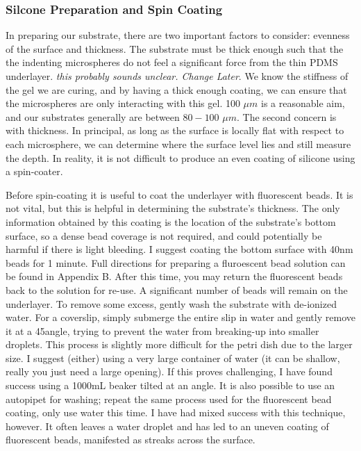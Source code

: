 \subsubsection{Silcone Preparation and Spin Coating} 
In preparing our substrate, there are two important factors to consider: evenness of the surface and thickness. The substrate must be thick enough such that the the indenting microspheres do not feel a significant force from the thin PDMS underlayer. \emph{this probably sounds unclear. Change Later}. We know the stiffness of the gel we are curing, and by having a thick enough coating, we can ensure that the microspheres are only interacting with this gel. 100 $\mu m$ is a reasonable aim, and our substrates generally are between $80-100$ $\mu m$. The second concern is with thickness. In principal, as long as the surface is locally flat with respect to each microsphere, we can determine where the surface level lies and still measure the depth. In reality, it is not difficult to produce an even coating of silicone using a spin-coater. 

Before spin-coating it is useful to coat the underlayer with fluorescent beads. It is not vital, but this is helpful in determining the substrate's thickness. The only information obtained by this coating is the location of the substrate's bottom surface, so a dense bead coverage is not required, and could potentially be harmful if there is light bleeding. I suggest coating the bottom surface with 40nm beads for 1 minute. Full directions for preparing a fluroescent bead solution can be found in Appendix B. After this time, you may return the fluorescent beads back to the solution for re-use. A significant number of beads will remain on the underlayer. To remove some excess, gently wash the substrate with de-ionized water. For a coverslip, simply submerge the entire slip in water and gently remove it at a 45\degree angle, trying to prevent the water from breaking-up into smaller droplets. This process is slightly more difficult for the petri dish due to the larger size. I suggest  (either) using a very large container of water (it can be shallow, really you just need a large opening). If this proves challenging, I have found success using a 1000mL beaker tilted at an angle. It is also possible to use an autopipet for washing; repeat the same process used for the fluorescent bead coating, only use water this time. I have had mixed success with this technique, however. It often leaves a water droplet and has led to an uneven coating of fluorescent beads, manifested as streaks across the surface.

